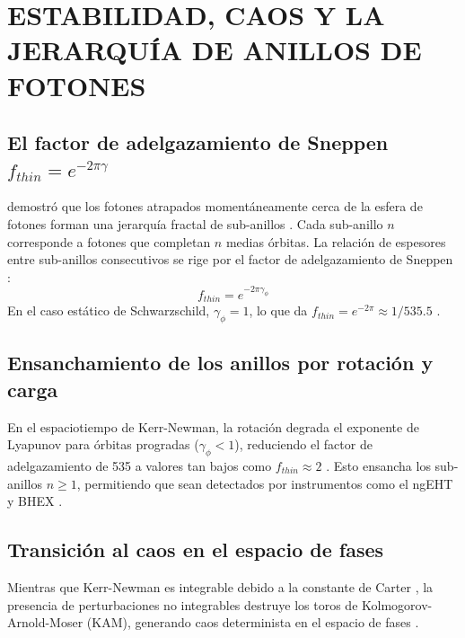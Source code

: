 \chapter{ESTABILIDAD, CAOS Y LA JERARQUÍA DE ANILLOS DE FOTONES}

\section{El factor de adelgazamiento de Sneppen \texorpdfstring{$f_{thin} = e^{-2\pi\gamma}$}{f\_thin = e^{-2 pi gamma}}}
\citet{Sneppen} demostró que los fotones atrapados momentáneamente cerca de la esfera de fotones forman una jerarquía fractal de sub-anillos \citep{Sneppen, pertbuciiones_teoria_en_bh}. Cada sub-anillo $n$ corresponde a fotones que completan $n$ medias órbitas. La relación de espesores entre sub-anillos consecutivos se rige por el factor de adelgazamiento de Sneppen \citep{Sneppen}:
\begin{equation}
    f_{thin} = e^{-2\pi\gamma_\phi}
    \label{eq:factor_sneppen}
\end{equation}
En el caso estático de Schwarzschild, $\gamma_\phi = 1$, lo que da $f_{thin} = e^{-2\pi} \approx 1/535.5$ \citep{Sneppen, chaos_fractals_photon_ring}.

\section{Ensanchamiento de los anillos por rotación y carga}
En el espaciotiempo de Kerr-Newman, la rotación degrada el exponente de Lyapunov para órbitas progradas ($\gamma_\phi < 1$), reduciendo el factor de adelgazamiento de 535 a valores tan bajos como $f_{thin} \approx 2$ \citep{Sneppen, bh_mergers_photon_ring}. Esto ensancha los sub-anillos $n \ge 1$, permitiendo que sean detectados por instrumentos como el ngEHT y BHEX \citep{Measuring_Photon_Rings_with_the_ngEHT, 2406.09498v1}.

\section{Transición al caos en el espacio de fases}
Mientras que Kerr-Newman es integrable debido a la constante de Carter \citep{1403.5234v2, Achour_2025_J._Cosmol._Astropart._Phys._2025_012}, la presencia de perturbaciones no integrables destruye los toros de Kolmogorov-Arnold-Moser (KAM), generando caos determinista en el espacio de fases \citep{chaos_fractals_photon_ring}.
\label{cap5}
